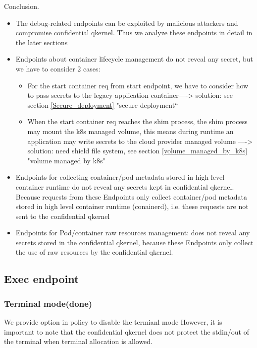 Conclusion.
\begin{itemize}
    \item  The debug-related endpoints can be exploited by malicious attackers and compromise confidential qkernel. Thus we analyze these endpoints in detail in the later sections
    \item  Endpoints about container lifecycle management do not reveal any secret, but we have to consider 2 cases:
    \begin{itemize}
        \item  For the start container req from start endpoint, we have to consider how to pass secrets to the legacy application container----> solution: see section \ref*{Secure_deployment} "secure deployment“
        \item  When the start container req reaches the shim process, the shim process may mount the k8s managed volume, this means during runtime an application may write secrets to the cloud provider managed volume ----> solution: need shield file system, see section \ref*{volume_managed_by_k8s} "volume managed by k8s"
    \end{itemize}
    \item Endpoints for collecting container/pod metadata stored in high level container runtime do not reveal any secrets kept in confidential qkernel. Because requests from these Endpoints only collect container/pod metadata stored in high level container runtime (conainerd), i.e. these requests are not sent to the confidential qkernel
    \item  Endpoints for Pod/container raw resources management: does not reveal any secrets stored in the confidential qkernel, because these Endpoints only collect the use of raw resources by the confidential qkernel.
\end{itemize}


\subsection{Exec endpoint}
\subsubsection{Terminal mode(done)}
We provide option in policy to disable the termianl mode
However, it is important to note that the confidential qkernel does not protect the stdin/out of the terminal when terminal allocation is allowed. 

